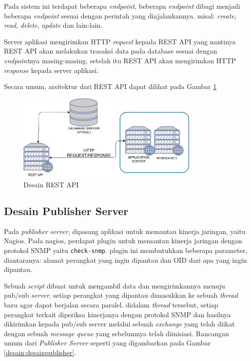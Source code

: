             	Pada sistem ini terdapat beberapa \textit{endpoint}, beberapa \textit{endpoint} dibagi menjadi beberapa \textit{endpoint} sesuai dengan perintah yang diajalankannya. misal: \textit{create}, \textit{read}, \textit{delete}, \textit{update} dan lain-lain.
            	
            	Server aplikasi mengirimkan HTTP \textit{request} kepada REST API yang nantinya REST API akan melakukan trasaksi data pada database sesuai dengan \textit{endpoint}nya masing-masing. setelah itu REST API akan mengirimkan HTTP \textit{response} kepada server aplikasi.
            	
            	Secara umum, arsitektur dari REST API dapat dilihat pada Gambar \ref{desain:desainrestapi}\\
                \begin{figure}[H]
                    \centering
                    \includegraphics[width=9cm]{Images/C-3/desainrestapi.png}
                    \caption{Desain REST API}
                    \label{desain:desainrestapi}
				\end{figure}
            
		\subsection{Desain Publisher Server}
			Pada \textit{publisher server}, dipasang aplikasi untuk memantau kinerja jaringan, yaitu Nagios. Pada nagios, perdapat plugin untuk memantau kinerja jaringan dengan protokol SNMP yaitu \texttt{check-snmp}. plugin ini membutuhkan beberapa parameter, diantaranya: alamat perangkat yang ingin dipantau dan OID dari apa yang ingin dipantau.
			
			Sebuah \textit{script} dibuat untuk mengambil data dan mengirimkannya menuju pub/sub \textit{server}. setiap perangkat yang dipantau dimasukkan ke sebuah \textit{thread} baru agar dapat berjalan secara paralel. didalam \textit{thread} tersebut, setiap perangkat terkait diperiksa kinerjanya dengan protokol SNMP dan hasilnya dikirimkan kepada pub/sub server melalui sebuah \textit{exchange} yang telah diikat dengan sebuah \textit{message queue} yang sebelumnya telah diinisiasi. Rancangan umum dari \textit{Publisher Server} seperti yang digambarkan pada Gambar \ref{desain:desainpublisher}.
			

